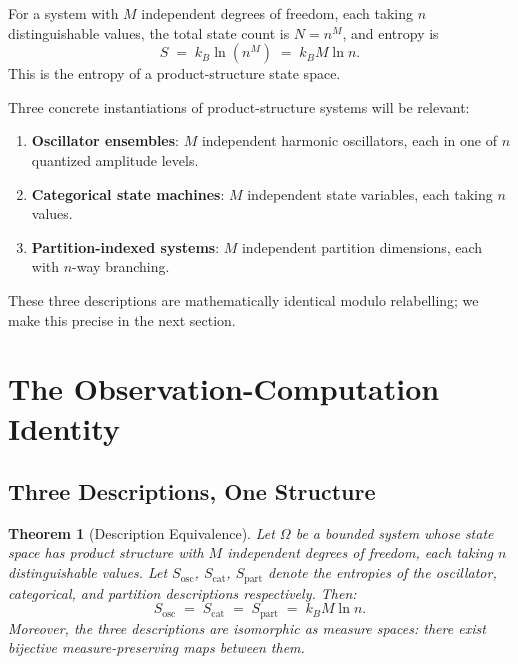 \documentclass[11pt,a4paper]{article}
\newtheorem{theorem}{Theorem}[section]
\theoremstyle{definition}
\theoremstyle{remark}
\begin{document}
For a system with $M$ independent degrees of freedom, each taking $n$ distinguishable values, the total state count is $N = n^M$, and entropy is
\begin{equation}
\label{eq:product-entropy}
S \;=\; k_B \ln(n^M) \;=\; k_B M \ln n.
\end{equation}
This is the entropy of a product-structure state space.

Three concrete instantiations of product-structure systems will be relevant:
\begin{enumerate}
    \item \textbf{Oscillator ensembles}: $M$ independent harmonic oscillators, each in one of $n$ quantized amplitude levels.
    \item \textbf{Categorical state machines}: $M$ independent state variables, each taking $n$ values.
    \item \textbf{Partition-indexed systems}: $M$ independent partition dimensions, each with $n$-way branching.
\end{enumerate}

These three descriptions are mathematically identical modulo relabelling; we make this precise in the next section.

\section{The Observation-Computation Identity}
\label{sec:identity}

\subsection{Three Descriptions, One Structure}

\begin{theorem}[Description Equivalence]
\label{thm:desc-equiv}
Let $\Omega$ be a bounded system whose state space has product structure with $M$ independent degrees of freedom, each taking $n$ distinguishable values. Let $S_{\text{osc}}$, $S_{\text{cat}}$, $S_{\text{part}}$ denote the entropies of the oscillator, categorical, and partition descriptions respectively. Then:
\[
S_{\text{osc}} \;=\; S_{\text{cat}} \;=\; S_{\text{part}} \;=\; k_B M \ln n.
\]
Moreover, the three descriptions are isomorphic as measure spaces: there exist bijective measure-preserving maps between them.
\end{theorem}
\end{document}

